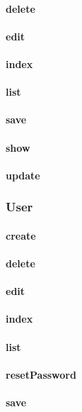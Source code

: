 \documentclass[12pt]{article}
\begin{document}
\paragraph{delete}
\paragraph{edit}
\paragraph{index}
\paragraph{list}
\paragraph{save}
\paragraph{show}
\paragraph{update}

\subsubsection{User}\label{sec:CUser}
\paragraph{create}
\paragraph{delete}
\paragraph{edit}
\paragraph{index}
\paragraph{list}
\paragraph{resetPassword}
\paragraph{save}
\end{document}
